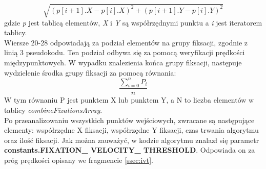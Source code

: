 \[
        \sqrt{(p[i+1].X - p[i].X)^2 + (p[i+1].Y - p[i].Y)^2}
\]
gdzie \emph{p} jest tablicą elementów, \emph{X} i \emph{Y} są współrzędnymi punktu a \emph{i} jest iteratorem tablicy.\\
Wiersze 20-28 odpowiadają za podział elementów na grupy fiksacji, zgodnie z linią 3 pseudokodu. Ten podział odbywa się za pomocą weryfikacji prędkości międzypunktowych. W wypadku znalezienia końca grupy fiksacji, następuje wydzielenie środka grupy fiksacji za pomocą równania:
\[
        \frac{\sum_{i = 0}^{n}{P_i}}{n}
\]
W tym równaniu P jest punktem X lub punktem Y, a N to liczba elementów w tablicy \emph{combineFixationsArray}.\\
Po przeanalizowaniu wszystkich punktów wejściowych, zwracane są następujące elementy: współrzędne X fiksacji, współrzędne Y fiksacji, czas trwania algorytmu oraz ilość fiksacji. Jak można zauważyć, w kodzie algorytmu znalazł się parametr \textbf{constants.FIXATION\_ VELOCITY\_ THRESHOLD}. Odpowiada on za próg prędkości opisany we fragmencie \ref{ssec:ivt}.
